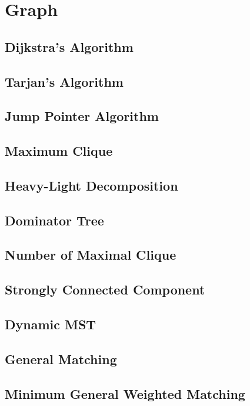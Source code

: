 \documentclass[a4paper,10pt,twocolumn,oneside]{article}
\begin{document}
\section{Graph}
\subsection{Dijkstra's Algorithm}

\subsection{Tarjan's Algorithm}

\subsection{Jump Pointer Algorithm}

\subsection{Maximum Clique}

\subsection{Heavy-Light Decomposition}

\subsection{Dominator Tree}

\subsection{Number of Maximal Clique}

\subsection{Strongly Connected Component}

\subsection{Dynamic MST}

\subsection{General Matching}

\subsection{Minimum General Weighted Matching}

\end{document}
